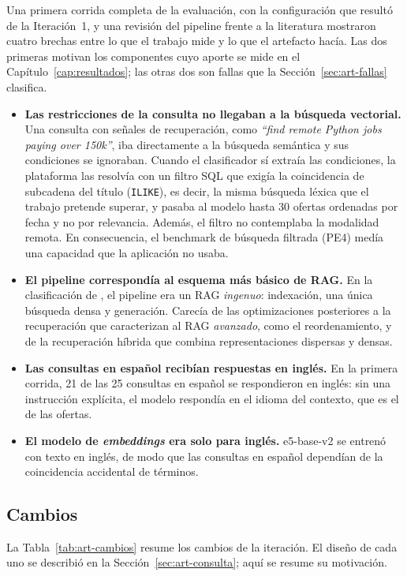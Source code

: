 Una primera corrida completa de la evaluación, con la configuración que resultó de la Iteración~1, y una revisión del pipeline frente a la literatura mostraron cuatro brechas entre lo que el trabajo mide y lo que el artefacto hacía. Las dos primeras motivan los componentes cuyo aporte se mide en el Capítulo~\ref{cap:resultados}; las otras dos son fallas que la Sección~\ref{sec:art-fallas} clasifica.
\begin{itemize}
    \item \textbf{Las restricciones de la consulta no llegaban a la búsqueda vectorial.} Una consulta con señales de recuperación, como \textit{\enquote{find remote Python jobs paying over 150k}}, iba directamente a la búsqueda semántica y sus condiciones se ignoraban. Cuando el clasificador sí extraía las condiciones, la plataforma las resolvía con un filtro SQL que exigía la coincidencia de subcadena del título (\texttt{ILIKE}), es decir, la misma búsqueda léxica que el trabajo pretende superar, y pasaba al modelo hasta 30 ofertas ordenadas por fecha y no por relevancia. Además, el filtro no contemplaba la modalidad remota. En consecuencia, el benchmark de búsqueda filtrada (PE4) medía una capacidad que la aplicación no usaba.
    \item \textbf{El pipeline correspondía al esquema más básico de RAG.} En la clasificación de \citet{Gao2023}, el pipeline era un RAG \emph{ingenuo}: indexación, una única búsqueda densa y generación. Carecía de las optimizaciones posteriores a la recuperación que caracterizan al RAG \emph{avanzado}, como el reordenamiento, y de la recuperación híbrida que combina representaciones dispersas y densas.
    \item \textbf{Las consultas en español recibían respuestas en inglés.} En la primera corrida, 21 de las 25 consultas en español se respondieron en inglés: sin una instrucción explícita, el modelo respondía en el idioma del contexto, que es el de las ofertas.
    \item \textbf{El modelo de \textit{embeddings} era solo para inglés.} e5-base-v2 \citep{Wang2022E5} se entrenó con texto en inglés, de modo que las consultas en español dependían de la coincidencia accidental de términos.
\end{itemize}

\subsection{Cambios}

La Tabla~\ref{tab:art-cambios} resume los cambios de la iteración. El diseño de cada uno se describió en la Sección~\ref{sec:art-consulta}; aquí se resume su motivación.

